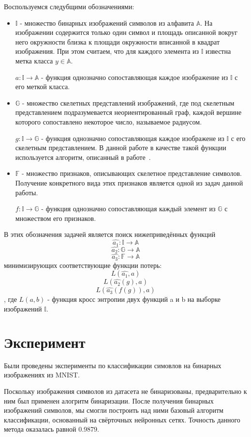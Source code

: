 ﻿\documentclass{llncs}
\begin{document}
Воспользуемся следубщими обозначениями: 
\begin{itemize}
\item $\mathbb{I}$ - множество бинарных изображений символов из алфавита $\mathbb{A}$. На изображении содержится только один символ и площадь описанной вокруг него окружности близка к площади окружности вписанной в квадрат изображения. При этом считаем, что для каждого элемента из $\mathbb{I}$ известна метка класса $y \in \mathbb{A}$. 

$a: \mathbb{I} \rightarrow \mathbb{A}$ - функция однозначно сопоставляющая каждое изображение из $\mathbb{I}$ с его меткой класса.

\item $\mathbb{G}$ - множество скелетных представлений изображений, где под скелетным представлением подразумевается неориентированный граф, каждой вершине которого сопоставлено некоторое число, называемое радиусом.

$g: \mathbb{I} \rightarrow \mathbb{G}$ - функция однозначно сопоставляющая каждое изображене из $\mathbb{I}$  с его скелетным представлением. В данной работе в качестве такой функции используется алгоритм, описанный в работе~\cite{graphs_gen}.

\item $\mathbb{F}$ - множество признаков, описывающих скелетное представление символов. Получение конкретного вида этих признаков является одной из задач данной работы.

$f: \mathbb{I} \rightarrow \mathbb{G}$ - функция однозначно сопоставляющая каждый элемент из $\mathbb{G}$ с множеством его признаков.
\end{itemize}

В этих обозначения задачей является поиск нижеприведённых функций
 $$\hat{a_1}: \mathbb{I} \rightarrow \mathbb{A}$$
 $$ \hat{a_2}: \mathbb{G} \rightarrow \mathbb{A} $$ 
 $$\hat{a_3}: \mathbb{F} \rightarrow \mathbb{A}$$
 минимизирующих соответствующие функции потерь:
 $$L(\hat{a_1}, a)$$
 $$L(\hat{a_2}(g), a)$$ 
 $$L(\hat{a_3}(f(g)), a)$$
 , где $L(a, b)$ - функция кросс энтропии двух функций a и b на выборке изображений $\mathbb{I}$.
 
\section{Эксперимент}

Были проведены эксперименты по классификации симовлов на бинарных изображениях из MNIST.

Поскольку изображения символов из датасета не бинаризованы, предварительно к ним был применен алогритм бинаризации.
После получения бинарных изображений символов, мы смогли построить над ними базовый алгоритм классификации, основанный на свёрточных нейронных сетях. Точность данного метода оказалась равной 0.9879.
\end{document}
